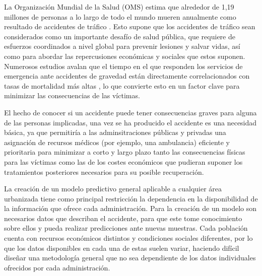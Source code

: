 \documentclass{uathesis-es}
\begin{document}






La Organización Mundial de la Salud (OMS) estima que alrededor de 1,19 millones de personas a lo largo de todo el mundo mueren anualmente como resultado de accidentes de tráfico \cite{WHO}. Esto supone que los accidentes de tráfico sean considerados como un importante desafío de salud pública, que requiere de esfuerzos coordinados a nivel global para prevenir lesiones y salvar vidas, así como para abordar las repercusiones económicas y sociales que estos suponen. Numerosos estudios avalan que el tiempo en el que responden los servicios de emergencia ante accidentes de gravedad están directamente correlacionados con tasas de mortalidad más altas \cite{timeresponse_deaths}, lo que convierte esto en un factor clave para minimizar las consecuencias de las víctimas.



El hecho de conocer si un accidente puede tener consecuencias graves para alguna de las personas implicadas, una vez se ha producido el accidente es una necesidad básica, ya que permitiría a las adminsitraciones públicas y privadas una asignación de recursos médicos (por ejemplo, una ambulancia) eficiente y prioritaria para minimizar a corto y largo plazo tanto las consecuencias físicas para las víctimas como las de los costes económicos que pudieran suponer los tratamientos posteriores necesarios para su posible recuperación.  


La creación de un modelo predictivo general aplicable a cualquier área urbanizada tiene como principal restricción la dependencia en la disponibilidad de la información que ofrece cada administración. Para la creación de un modelo son necesarios datos que describan el accidente, para que este tome conocimiento sobre ellos y pueda realizar predicciones ante nuevas muestras. Cada población cuenta con recursos económicos distintos y condiciones sociales diferentes, por lo que los datos disponibles en cada una de estas suelen variar, haciendo difícil diseñar una metodología general que no sea dependiente de los datos individuales ofrecidos por cada administración.
 
\end{document}
